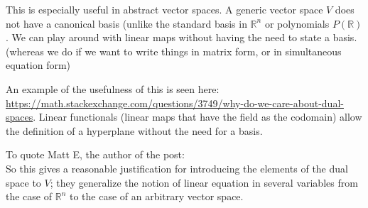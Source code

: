\documentclass{article}
\begin{document}
This is especially useful in abstract vector spaces. A generic vector space $V$ does not have a canonical basis (unlike the standard basis in $\mathbb{R}^n$ or polynomials $P(\mathbb{R})$. We can play around with linear maps without having the need to state a basis. (whereas we do if we want to write things in matrix form, or in simultaneous equation form)

An example of the usefulness of this is seen here: \url{https://math.stackexchange.com/questions/3749/why-do-we-care-about-dual-spaces}.
Linear functionals (linear maps that have the field as the codomain) allow the definition of a hyperplane without the need for a basis.

To quote Matt E, the author of the post:\\
So this gives a reasonable justification for introducing the elements of the dual space to $V$; they generalize the notion of linear equation in several variables from the case of $\mathbb{R}^n$ to the case of an arbitrary vector space.
\end{document}
